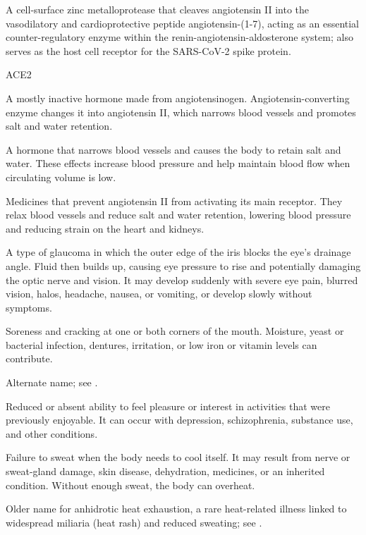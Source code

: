  A cell-surface zinc metalloprotease that cleaves angiotensin II into the vasodilatory and cardioprotective peptide angiotensin-(1-7), acting as an essential counter-regulatory enzyme within the renin-angiotensin-aldosterone system; also serves as the host cell receptor for the SARS-CoV-2 spike protein.

\synonyms
ACE2

 A mostly inactive hormone made from angiotensinogen. Angiotensin-converting enzyme changes it into angiotensin II, which narrows blood vessels and promotes salt and water retention.

 A hormone that narrows blood vessels and causes the body to retain salt and water. These effects increase blood pressure and help maintain blood flow when circulating volume is low.

 Medicines that prevent angiotensin II from activating its main receptor. They relax blood vessels and reduce salt and water retention, lowering blood pressure and reducing strain on the heart and kidneys.

 A type of glaucoma in which the outer edge of the iris blocks the eye’s drainage angle. Fluid then builds up, causing eye pressure to rise and potentially damaging the optic nerve and vision. It may develop suddenly with severe eye pain, blurred vision, halos, headache, nausea, or vomiting, or develop slowly without symptoms.

 Soreness and cracking at one or both corners of the mouth. Moisture, yeast or bacterial infection, dentures, irritation, or low iron or vitamin levels can contribute.

 Alternate name; see .

 Reduced or absent ability to feel pleasure or interest in activities that were previously enjoyable. It can occur with depression, schizophrenia, substance use, and other conditions.

 Failure to sweat when the body needs to cool itself. It may result from nerve or sweat-gland damage, skin disease, dehydration, medicines, or an inherited condition. Without enough sweat, the body can overheat.

 Older name for anhidrotic heat exhaustion, a rare heat-related illness linked to widespread miliaria (heat rash) and reduced sweating; see .

